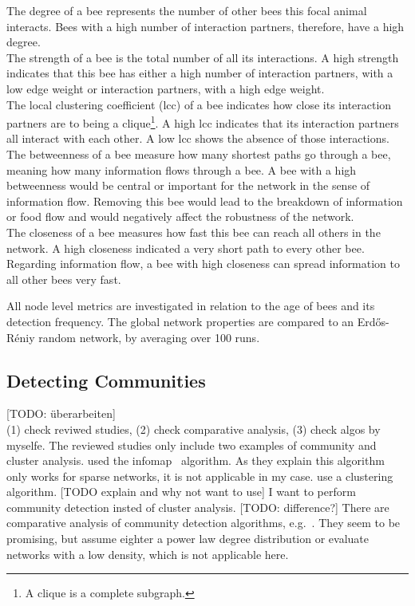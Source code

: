 The degree of a bee represents the number of other bees this focal animal interacts. Bees with a high number of interaction partners, therefore, have a high degree.\\
The strength of a bee is the total number of all its interactions. A high strength indicates that this bee has either a high number of interaction partners, with a low edge weight or interaction partners, with a high edge weight.\\
The local clustering coefficient (lcc) of a bee indicates how close its interaction partners are to being a clique\footnote{A clique is a complete subgraph.}. A high lcc indicates that its interaction partners all interact with each other. A low lcc shows the absence of those interactions.\\
The betweenness of a bee measure how many shortest paths go through a bee, meaning how many information flows through a bee.
A bee with a high betweenness would be central or important for the network in the sense of information flow. Removing this bee would lead to the breakdown of information or food flow and would negatively affect the robustness of the network.\\
The closeness of a bee measures how fast this bee can reach all others in the network. A high closeness indicated a very short path to every other bee. Regarding information flow, a bee with high closeness can spread information to all other bees very fast.

All node level metrics are investigated in relation to the age of bees and its detection frequency.
The global network properties are compared to an Erd\H{o}s-R\'{e}niy random network, by averaging over 100 runs.\\




\subsection{Detecting Communities}
\label{subsec:APcommunityDet}
[TODO: überarbeiten]\\
(1) check reviwed studies, (2) check comparative analysis, (3) check algos by myselfe.
The reviewed studies only include two examples of community and cluster analysis.
\textcite{mersch2013tracking} used the infomap~\cite{rosvall2009map,rosvall2007information} algorithm. As they explain this algorithm only works for sparse networks, it is not applicable in my case. \textcite{baracchi2014socio} use a clustering algorithm. [TODO explain and why not want to use] I want to perform community detection insted of cluster analysis. [TODO: difference?]
There are comparative analysis of community detection algorithms, e.g.~\cite{yang2016comparative, harenberg2014community}. They seem to be promising, but assume eighter a power law degree distribution or evaluate networks with a low density, which is not applicable here.

